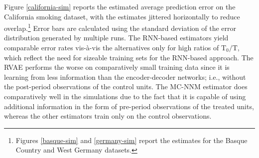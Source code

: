 \documentclass[hidelinks,12pt]{article}
\begin{document}
Figure \ref{california-sim} reports the estimated average prediction error on the California smoking dataset, with the estimates jittered horizontally to reduce overlap.\footnote{Figures \ref{basque-sim} and \ref{germany-sim} report the estimates for the Basque Country and West Germany datasets.} Error bars are calculated using the standard deviation of the error distribution generated by multiple runs. The RNN-based estimators yield comparable error rates vis-à-vis the alternatives only for high ratios of $\text{T}_0/\text{T}$, which reflect the need for sizeable training sets for the RNN-based approach. The RVAE performs the worse on comparatively small training data since it is learning from less information than the encoder-decoder networks; i.e., without the post-period observations of the control units. The MC-NNM estimator does comparatively well in the simulations due to the fact that it is capable of using additional information in the form of pre-period observations of the treated units, whereas the other estimators train only on the control observations. 
\end{document}
